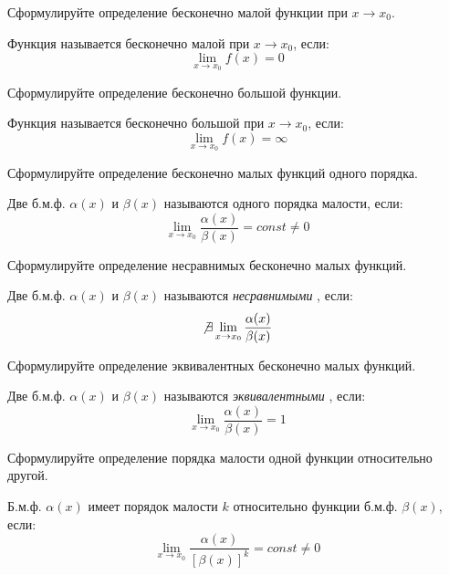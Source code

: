 \begin{question}
  Сформулируйте определение бесконечно малой функции при $x \to x_0$. 
\end{question}
\begin{answer}
  Функция называется бесконечно малой при $x \to x_0$, если: \[
    \lim_{x \to x_0} f(x) = 0
  \] 
\end{answer}

\begin{question}
  Сформулируйте определение бесконечно большой функции.
\end{question}
\begin{answer}
  Функция называется бесконечно большой при $x \to x_0$, если: \[
    \lim_{x \to x_0} f(x) = \infty
  \] 
\end{answer}

\begin{question}
  Сформулируйте определение бесконечно малых функций одного порядка.
\end{question}
\begin{answer}
  Две б.м.ф. $\alpha(x)$ и $\beta(x)$ называются одного порядка малости, если: \[
    \lim_{x \to x_0} \frac{\alpha(x)}{\beta(x)} = const \neq 0
  \] 
\end{answer}

\begin{question}
  Сформулируйте определение несравнимых бесконечно малых функций. 
\end{question}
\begin{answer}
  Две б.м.ф. $\alpha(x)$ и $\beta(x)$ называются \textit{несравнимыми} , если: \[
    \not \exists \lim_{x \to x_0} \frac{\alpha(x)}{\beta(x)}
  \]   
\end{answer}

\begin{question}
  Сформулируйте определение эквивалентных бесконечно малых функций. 
\end{question}
\begin{answer}
  Две б.м.ф. $\alpha(x)$ и $\beta(x)$ называются \textit{эквивалентными} , если: \[
    \lim_{x \to x_0} \frac{\alpha(x)}{\beta(x)} = 1
  \]
\end{answer}

\begin{question}
  Сформулируйте определение порядка малости одной функции относительно
другой.
\end{question}
\begin{answer}
  Б.м.ф. $\alpha(x)$ имеет порядок малости $k$ относительно функции б.м.ф.  $\beta(x)$, если: \[
    \lim_{x \to x_0} \frac{\alpha(x)}{[\beta(x)]^k} = const \neq 0
  \]
\end{answer}

